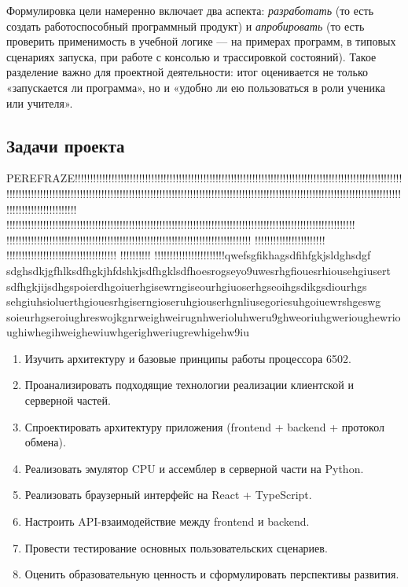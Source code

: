 \documentclass[12pt,a4paper]{article}
\begin{document}
Формулировка цели намеренно включает два аспекта: \textit{разработать} (то есть создать работоспособный программный продукт) и \textit{апробировать} (то есть проверить применимость в учебной логике --- на примерах программ, в типовых сценариях запуска, при работе с консолью и трассировкой состояний). Такое разделение важно для проектной деятельности: итог оценивается не только «запускается ли программа», но и «удобно ли ею пользоваться в роли ученика или учителя».

\subsection{Задачи проекта}
PEREFRAZE!!!!!!!!!!!!!!!!!!!!!!!!!!!!!!!!!!!!!!!!!!!!!!!!!!!!!!!!!!!!!!!!!!!!!!!!!!!!!!!!!!!!!!!!!!!!!!!!!!!!!!!!!!!!!!!!!!!!!!!!!!!!!!!!!!!!!!!!!!!!!!!!!!!!!!!!!!!!!!!!!!!!!!!!!!!!!!!!!!!!!!!!!!!!!!!!!!!!!!!!!!!!!!!!!!!!!!!!!!!!!!!!!!!!!!!!!!!!!!!!!!!!!!!!!!!!!!!!!!!
!!!!!!!!!!!!!!!!!!!!!!!!!!!!!!!!!!!!!!!!!!!!!!!!!!!!!!!!!!!!!!!!!!!!!!!!!!!!!!!!!!!!!!!!!!!!!!!!!!!!!!!!!!!!!!!!!!
!!!!!!!!!!!!!!!!!!!!!!!!!!!!!!!!!!!!!!!!!!!!!!!!!!!!!!!!!!!!!!!!!!!!!!!!!!!!!!!!
!!!!!!!!!!!!!!!!!!!!!!!
!!!!!!!!!!!!!!!!!!!!!!!!!!!!!!!!!!!!
!!!!!!!!!!
!!!!!!!!!!!!!!!!!!!!!!!qwefsgfikhagsdfihfgkjsldghsdgf
sdghsdkjgfhlksdfhgkjhfdshkjsdfhgklsdfhoesrogseyo9uwesrhgfiouesrhiousehgiusert
sdfhgkjijsdhgspoierdhgoiuerhgisewrngiseourhgiuoserhgseoihgsdikgsdiourhgs
sehgiuhsioluerthgiouesrhgiserngioseruhgiouserhgnliusegoriesuhgoiuewrshgeswg
soieurhgseroiughreswojkgnrweighweirugnhwerioluhweru9ghweoriuhgwerioughewrioughiwhegihweighewiuwhgerighweriugrewhigehw9iu

\begin{enumerate}
  \item Изучить архитектуру и базовые принципы работы процессора 6502.
  \item Проанализировать подходящие технологии реализации клиентской и серверной частей.
  \item Спроектировать архитектуру приложения (frontend + backend + протокол обмена).
  \item Реализовать эмулятор CPU и ассемблер в серверной части на Python.
  \item Реализовать браузерный интерфейс на React + TypeScript.
  \item Настроить API-взаимодействие между frontend и backend.
  \item Провести тестирование основных пользовательских сценариев.
  \item Оценить образовательную ценность и сформулировать перспективы развития.
\end{enumerate}
\end{document}
